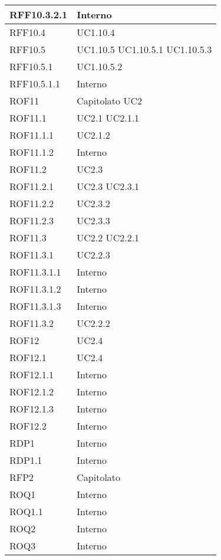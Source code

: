 \begin{center}
\begin{longtable}{| p{4cm} | p{4cm} |}
\hline
RFF10.3.2.1   &  Interno \\
\hline
RFF10.4   &  UC1.10.4 \\
\hline
RFF10.5   &  UC1.10.5 \newline UC1.10.5.1 \newline UC1.10.5.3 \\
\hline
RFF10.5.1   &  UC1.10.5.2 \\
\hline
RFF10.5.1.1   &  Interno \\
\hline
ROF11   &  Capitolato \newline UC2 \\
\hline
ROF11.1   &  UC2.1 \newline UC2.1.1 \\
\hline
ROF11.1.1   &  UC2.1.2 \\
\hline
ROF11.1.2   &  Interno \\
\hline
ROF11.2   &  UC2.3  \\
\hline
ROF11.2.1   &  UC2.3 \newline UC2.3.1 \\
\hline
ROF11.2.2   &  UC2.3.2 \\
\hline
ROF11.2.3   &  UC2.3.3 \\
\hline
ROF11.3   &  UC2.2 \newline UC2.2.1 \\
\hline
ROF11.3.1   &  UC2.2.3 \\
\hline
ROF11.3.1.1   &  Interno \\
\hline
ROF11.3.1.2   &  Interno \\
\hline
ROF11.3.1.3   &  Interno \\
\hline
ROF11.3.2   &  UC2.2.2 \\
\hline
ROF12   &  UC2.4  \\
\hline
ROF12.1   &  UC2.4  \\
\hline
ROF12.1.1   &  Interno \\
\hline
ROF12.1.2   &  Interno \\
\hline
ROF12.1.3   &  Interno \\
\hline
ROF12.2   &  Interno \\
\hline
RDP1   &  Interno \\
\hline
RDP1.1   &  Interno \\
\hline
RFP2   &  Capitolato \\
\hline
ROQ1   &  Interno \\
\hline
ROQ1.1   &  Interno \\
\hline
ROQ2   &  Interno \\
\hline
ROQ3   &  Interno \\

\end{longtable}
\end{center}
